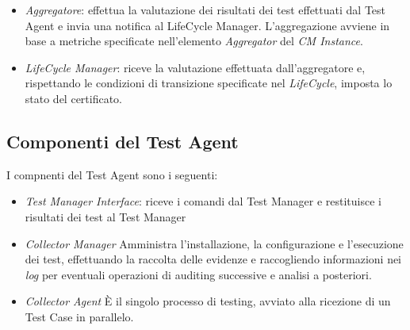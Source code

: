 \documentclass[../main.tex]{subfiles}
\begin{document}
\begin{itemize}
\item \textit{Aggregatore}: effettua la valutazione dei risultati dei test effettuati dal Test Agent e invia una notifica al LifeCycle Manager. L'aggregazione avviene in base a metriche specificate nell'elemento \textit{Aggregator} del \textit{CM Instance}.
\item \textit{LifeCycle Manager}: riceve la valutazione effettuata dall'aggregatore e, rispettando le condizioni di transizione specificate nel \textit{LifeCycle}, imposta lo stato del certificato.
\end{itemize}
\subsection{Componenti del Test Agent}
I compnenti del Test Agent sono i seguenti:
\begin{itemize}
\item \textit{Test Manager Interface}: riceve i comandi dal Test Manager e
restituisce i risultati dei test al Test Manager
\item \textit{Collector Manager} Amministra l'installazione, la configurazione e l'esecuzione dei test, effettuando la raccolta delle evidenze e raccogliendo informazioni nei \textit{log} per eventuali operazioni di auditing successive e analisi a posteriori.
\item \textit{Collector Agent} \`E il singolo processo di testing, avviato alla ricezione di un Test Case in parallelo.
\end{itemize}
\end{document}
